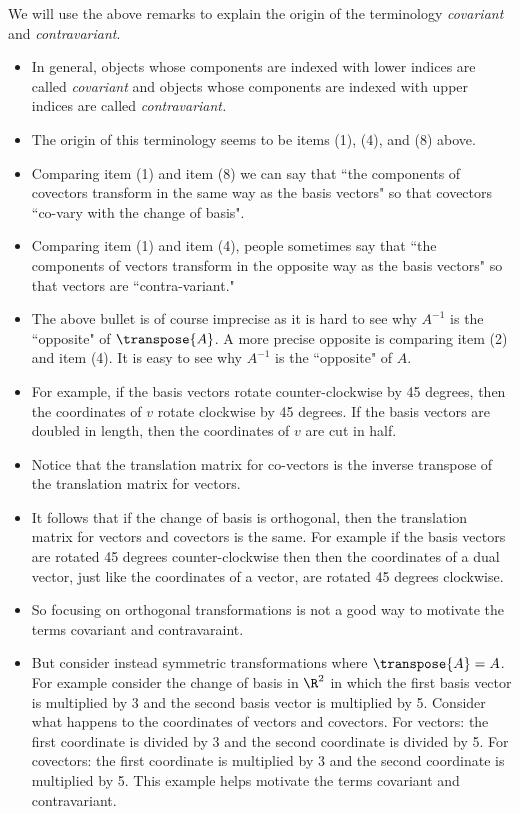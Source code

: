 \documentclass[oneside,12pt]{amsart}
\begin{document}
\begin{remark}
We will use the above remarks to explain the origin of the terminology \emph{covariant} and \emph{contravariant}.
\begin{itemize}
\item In general, objects whose components are indexed with lower indices are called \emph{covariant} and
objects whose components are indexed with upper indices are called \emph{contravariant.}
\item The origin of this terminology seems to be items (1), (4), and (8) above. 
\item Comparing item (1) and item (8)
we can say that ``the components of covectors transform in the same way as the basis vectors" so that
covectors ``co-vary with the change of basis". 
\item Comparing item (1) and item (4), people sometimes say that
``the components of vectors transform in the opposite way as the basis vectors" so that vectors are ``contra-variant."
\item The above bullet is of course imprecise as it is hard to see why $A^{-1}$ is the ``opposite" of  $\transpose{A}$.
A more precise opposite is comparing item (2) and item (4). It is easy to see why 
$A^{-1}$ is the ``opposite" of $A$.
\item For example,
if the basis vectors rotate counter-clockwise by 45 degrees, then the coordinates of $v$ rotate clockwise by 45 degrees.
If the basis vectors are doubled in length, then the coordinates of $v$ are cut in half.
\item Notice that the translation matrix for co-vectors is the inverse transpose of the translation matrix
for vectors.
\item It follows that if the change of basis is orthogonal, then the translation matrix for
vectors and covectors is the same. For example if the basis vectors are rotated 45 degrees counter-clockwise then
then the coordinates of a dual vector, just like the coordinates of a vector, are rotated 45 degrees clockwise.
\item So focusing on orthogonal transformations is not a good way to motivate the terms
covariant and contravaraint.
\item But consider instead symmetric transformations where $\transpose{A} = A$. For example consider
the change of basis in $\R^2$ in which the first basis vector is multiplied by 3 and the second
basis vector is multiplied by 5. Consider what happens to the coordinates of vectors and covectors.
For vectors: the first coordinate is divided by 3 and the second coordinate is divided by 5.
For covectors: the first coordinate is multiplied by 3 and the second coordinate is multiplied by 5.
This example helps motivate the terms covariant and contravariant.
\end{itemize}
\end{remark}
\end{document}
